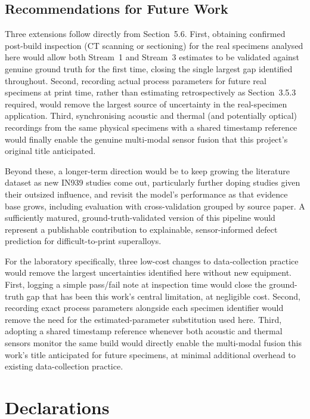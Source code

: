 \documentclass[a4paper]{article}
\begin{document}
\subsection{Recommendations for Future Work}
Three extensions follow directly from Section~5.6. First, obtaining confirmed post-build inspection (CT scanning or sectioning) for the real specimens analysed here would allow both Stream~1 and Stream~3 estimates to be validated against genuine ground truth for the first time, closing the single largest gap identified throughout. Second, recording actual process parameters for future real specimens at print time, rather than estimating retrospectively as Section~3.5.3 required, would remove the largest source of uncertainty in the real-specimen application. Third, synchronising acoustic and thermal (and potentially optical) recordings from the same physical specimens with a shared timestamp reference would finally enable the genuine multi-modal sensor fusion that this project's original title anticipated.

Beyond these, a longer-term direction would be to keep growing the literature dataset as new IN939 studies come out, particularly further doping studies given their outsized influence, and revisit the model's performance as that evidence base grows, including evaluation with cross-validation grouped by source paper. A sufficiently matured, ground-truth-validated version of this pipeline would represent a publishable contribution to explainable, sensor-informed defect prediction for difficult-to-print superalloys.

For the laboratory specifically, three low-cost changes to data-collection practice would remove the largest uncertainties identified here without new equipment. First, logging a simple pass/fail note at inspection time would close the ground-truth gap that has been this work's central limitation, at negligible cost. Second, recording exact process parameters alongside each specimen identifier would remove the need for the estimated-parameter substitution used here. Third, adopting a shared timestamp reference whenever both acoustic and thermal sensors monitor the same build would directly enable the multi-modal fusion this work's title anticipated for future specimens, at minimal additional overhead to existing data-collection practice.

\section*{Declarations}
\end{document}
